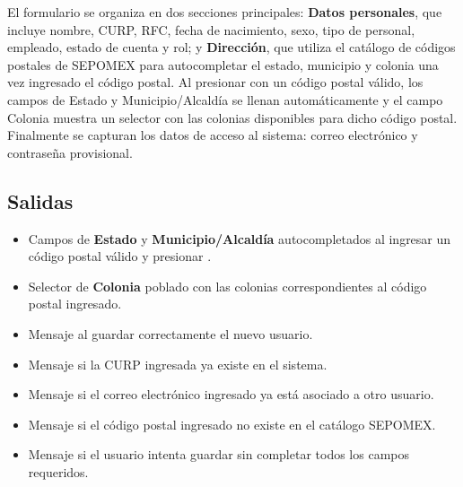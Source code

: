 El formulario se organiza en dos secciones principales: 
\textbf{Datos personales}, que incluye nombre, CURP, RFC, fecha 
de nacimiento, sexo, tipo de personal, empleado, estado de cuenta 
y rol; y \textbf{Dirección}, que utiliza el catálogo de códigos 
postales de SEPOMEX para autocompletar el estado, municipio y 
colonia una vez ingresado el código postal. Al presionar 
 con un código postal válido, los campos de 
Estado y Municipio/Alcaldía se llenan automáticamente y el campo 
Colonia muestra un selector con las colonias disponibles para 
dicho código postal. Finalmente se capturan los datos de acceso 
al sistema: correo electrónico y contraseña provisional.


\subsection{Salidas}
\begin{itemize}
	\item Campos de \textbf{Estado} y \textbf{Municipio/Alcaldía} 
	autocompletados al ingresar un código postal válido y presionar 
	.
	\item Selector de \textbf{Colonia} poblado con las colonias 
	correspondientes al código postal ingresado.
	\item Mensaje  al guardar 
	correctamente el nuevo usuario.
	\item Mensaje  si la CURP 
	ingresada ya existe en el sistema.
	\item Mensaje  si el correo 
	electrónico ingresado ya está asociado a otro usuario.
	\item Mensaje  si el 
	código postal ingresado no existe en el catálogo SEPOMEX.
	\item Mensaje  si 
	el usuario intenta guardar sin completar todos los campos 
	requeridos.
\end{itemize}


